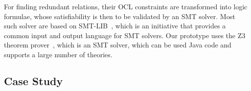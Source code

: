 
For finding redundant relations, their \gls{OCL} constraints are transformed into logic formulae, whose satisfiability is then to be validated by an \gls{SMT} solver.
Most such solver are based on SMT-LIB~\cite{smtlib2017}, which is an initiative that provides a common input and output language for \gls{SMT} solvers.
Our prototype uses the Z3 theorem prover~\cite{z32008}, which is an \gls{SMT} solver, which can be used Java code and supports a large number of theories.





\subsection{Case Study}
\label{chap:correctness_evaluation:compatibility:case_study}

